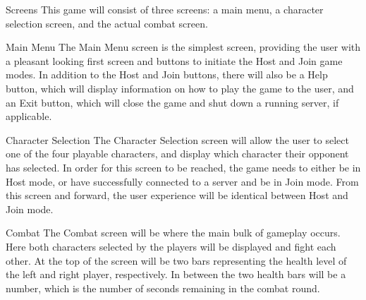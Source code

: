 \documentclass[12pt]{report}
\begin{document}
\begin{section}{Screens}
This game will consist of three screens: a main menu, a character selection
screen, and the actual combat screen.

\begin{subsection}{Main Menu}
The Main Menu screen is the simplest screen, providing the user with a pleasant
looking first screen and buttons to initiate the Host and Join game modes. In
addition to the Host and Join buttons, there will also be a Help button, which
will display information on how to play the game to the user, and an Exit
button, which will close the game and shut down a running server, if applicable.
\end{subsection}

\begin{subsection}{Character Selection}
The Character Selection screen will allow the user to select one of the four
playable characters, and display which character their opponent has selected.
In order for this screen to be reached, the game needs to either be in Host
mode, or have successfully connected to a server and be in Join mode. From this
screen and forward, the user experience will be identical between Host and Join
mode.
\end{subsection}

\begin{subsection}{Combat}
The Combat screen will be where the main bulk of gameplay occurs. Here both
characters selected by the players will be displayed and fight each other.
At the top of the screen will be two bars representing the health level of the
left and right player, respectively. In between the two health bars will be a
number, which is the number of seconds remaining in the combat round.
\end{subsection}

\end{section}
\end{document}
